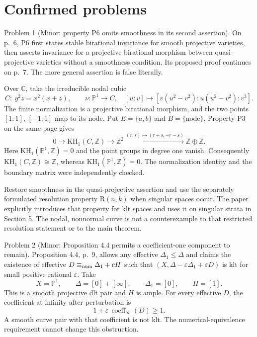 \documentclass[10pt]{article}
\begin{document}
\section*{Confirmed problems}
Problem 1 (Minor: property P6 omits smoothness in its second assertion).  On p. 6, P6 first states stable birational invariance for smooth projective varieties, then asserts invariance for a projective birational morphism between quasi-projective varieties without a smoothness condition. Its proposed proof continues on p. 7. The more general assertion is false literally.\par
Over \(\mathbb C\), take the irreducible nodal cubic \[C:\ y^2z=x^2(x+z),\qquad
 \nu:\mathbb P^1\longrightarrow C,\quad
 [u:v]\longmapsto[v(u^2-v^2):u(u^2-v^2):v^3].\] The finite normalization is a projective birational morphism, and the two points \([1:1]\), \([-1:1]\) map to its node. Put \(E=\{a,b\}\) and \(B=\{\text{node}\}\). Property P3 on the same page gives \[0\longrightarrow\mathrm{KH}_1(C,\mathbb Z)
 \longrightarrow\mathbb Z^2
 \xrightarrow{(r,s)\mapsto(r+s,-r-s)}
 \mathbb Z\oplus\mathbb Z.\] Here \(\mathrm{KH}_1(\mathbb P^1,\mathbb Z)=0\) and the point groups in degree one vanish. Consequently \(\mathrm{KH}_1(C,\mathbb Z)\cong\mathbb Z\), whereas \(\mathrm{KH}_1(\mathbb P^1,\mathbb Z)=0\). The normalization identity and the boundary matrix were independently checked.\par
Restore smoothness in the quasi-projective assertion and use the separately formulated resolution property \(\mathrm R(n,k)\) when singular spaces occur. The paper explicitly introduces that property for klt spaces and uses it on singular strata in Section 5. The nodal, nonnormal curve is not a counterexample to that restricted resolution statement or to the main theorem.\par
Problem 2 (Minor: Proposition 4.4 permits a coefficient-one component to remain).  Proposition 4.4, p. 9, allows any effective \(\Delta_1\le\Delta\) and claims the existence of effective \(D\equiv_{\rm num}\Delta_1+cH\) such that \((X,\Delta-\varepsilon\Delta_1+\varepsilon D)\) is klt for small positive rational \(\varepsilon\). Take \[X=\mathbb P^1,\qquad
 \Delta=[0]+[\infty],\qquad \Delta_1=[0],\qquad H=[1].\] This is a smooth projective dlt pair and \(H\) is ample. For every effective \(D\), the coefficient at infinity after perturbation is \[1+\varepsilon\,\operatorname{coeff}_{\infty}(D)\ge1.\] A smooth curve pair with that coefficient is not klt. The numerical-equivalence requirement cannot change this obstruction.\par
\end{document}
